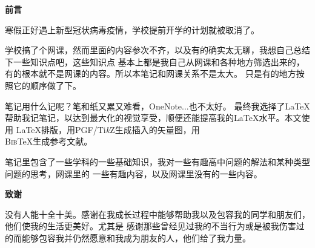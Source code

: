 \begin{center}
\begin{LARGE}
\textbf{前言}
\end{LARGE}
\end{center}

寒假正好遇上新型冠状病毒疫情，学校提前开学的计划就被取消了。

学校搞了个网课，然而里面的内容参次不齐，以及有的确实太无聊，我想自己总结下一些知识点吧，这些知识点
基本上都是我自己从网课和各种地方筛选出来的，有的根本就不是网课的内容。所以本笔记和网课关系不是太大。
只是有的地方按照它的顺序做了下。

笔记用什么记呢？笔和纸又累又难看，OneNote...也不太好。
最终我选择了\LaTeX 帮助我记笔记，以达到最大化的视觉享受，顺便还能提高我的\LaTeX 水平。本文使用
\LaTeX 排版，用PGF/Ti\emph{k}Z生成插入的矢量图，用\\
B\textsc{ib}\TeX 生成参考文献。

笔记里包含了一些学科的一些基础知识，我对一些有趣高中问题的解法和某种类型问题的思考，网课里的
一些有趣内容，以及网课里没有的一些内容。

\vspace{3.5cm}
\begin{center}
\begin{LARGE}
\textbf{致谢}
\end{LARGE}
\end{center}
没有人能十全十美。感谢在我成长过程中能够帮助我以及包容我的同学和朋友们，他们使我的生活更美好。尤其是
感谢那些曾经见过我的不当行为或是被我伤害过的而能够包容我并仍然愿意和我成为朋友的人，他们给了我力量。